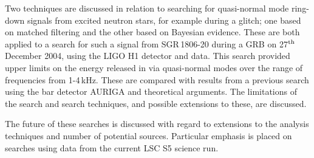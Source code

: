Two techniques are discussed in relation to searching for quasi-normal mode ring-down signals from
excited neutron stars, for example during a glitch; one based on matched filtering and the other
based on Bayesian evidence. These are both applied to a search for such a signal from SGR\,1806-20
during a GRB on 27$^{\rm th}$ December 2004, using the LIGO H1 detector and \geo data. This search
provided upper limits on the energy released in \gws via quasi-normal modes over the range of
frequencies from 1-4\,kHz. These are compared with results from a previous search using the bar
detector AURIGA \cite{Baggio:2005} and theoretical arguments. The limitations of the search and
search techniques, and possible extensions to these, are discussed.

The future of these searches is discussed with regard to extensions to the analysis techniques and
number of potential sources. Particular emphasis is placed on searches using data from the current
LSC S5 science run.